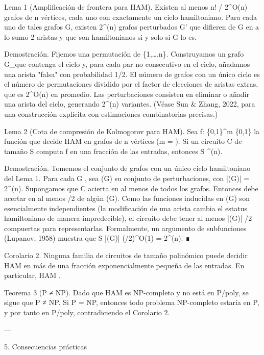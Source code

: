 \documentclass[12pt,twoside]{book}
\begin{document}
Lema 1 (Amplificación de frontera para HAM). Existen al menos n! / 2^{O(n)} grafos de n vértices, cada uno con exactamente un ciclo hamiltoniano. Para cada uno de tales grafos G, existen 2^{\Omega(n)} grafos perturbados G' que difieren de G en a lo sumo 2 aristas y que son hamiltonianos si y solo si G lo es.

Demostración. Fijemos una permutación \sigma de \{1,\dots,n\}. Construyamos un grafo G_\sigma que contenga el ciclo \sigma y, para cada par no consecutivo en el ciclo, añadamos una arista "falsa" con probabilidad 1/2. El número de grafos con un único ciclo es el número de permutaciones dividido por el factor de elecciones de aristas extras, que es 2^{O(n)} en promedio. Las perturbaciones consisten en eliminar o añadir una arista del ciclo, generando 2^{\Omega(n)} variantes. (Véase Sun \& Zhang, 2022, para una construcción explícita con estimaciones combinatorias precisas.)

Lema 2 (Cota de compresión de Kolmogorov para HAM). Sea f: \{0,1\}^m \to \{0,1\} la función que decide HAM en grafos de n vértices (m = ). Si un circuito C de tamaño S computa f en una fracción \delta de las entradas, entonces S \ge \delta {}^{\Omega(n)}.

Demostración. Tomemos el conjunto  de grafos con un único ciclo hamiltoniano del Lema 1. Para cada G \in {}, sea (G) su conjunto de perturbaciones, con |(G)| = 2^{\Omega(n)}. Supongamos que C acierta en al menos \delta de todos los grafos. Entonces debe acertar en al menos \delta/2 de algún (G). Como las funciones inducidas en (G) son esencialmente independientes (la modificación de una arista cambia el estatus hamiltoniano de manera impredecible), el circuito debe tener al menos |(G)| \cdot \delta/2 compuertas para representarlas. Formalmente, un argumento de subfunciones (Lupanov, 1958) muestra que S \ge |(G)| \cdot (\delta/2)^{O(1)} = 2^{\Omega(n)}. ∎

Corolario 2. Ninguna familia de circuitos de tamaño polinómico puede decidir HAM en más de una fracción exponencialmente pequeña de las entradas. En particular, HAM \notin {}.

Teorema 3 (P ≠ NP). Dado que HAM es NP-completo y no está en P/poly, se sigue que P ≠ NP. Si P = NP, entonces todo problema NP-completo estaría en P, y por tanto en P/poly, contradiciendo el Corolario 2.

---

5. Consecuencias prácticas
\end{document}
